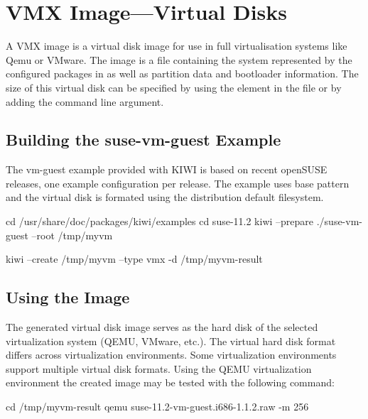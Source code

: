 \chapter{VMX Image---Virtual Disks}
\label{chapter:vmx}
\minitoc

A VMX image is a virtual disk image for use in full virtualisation
systems like Qemu or VMware. The image is a file containing the
system represented by the configured packages in %
 as well
as partition data and bootloader information. The size of
this virtual disk can be specified by using the  element
in the  file or by adding the  command
line argument.

\section{Building the suse-vm-guest Example}
The vm-guest example provided with KIWI is based on recent openSUSE releases,
one example configuration per release. The example uses base pattern and the
virtual disk is formated using the distribution default filesystem.

\begin{Command}{12cm}
cd /usr/share/doc/packages/kiwi/examples
cd suse-11.2
kiwi --prepare ./suse-vm-guest --root /tmp/myvm
\end{Command}

\begin{Command}{12cm}
kiwi --create /tmp/myvm --type vmx -d /tmp/myvm-result
\end{Command}

\section{Using the Image}

The generated virtual disk image serves as the hard disk of the selected
virtualization system (QEMU, VMware, etc.). The virtual hard disk format 
differs across virtualization environments. Some virtualization environments
support multiple virtual disk formats. Using the QEMU virtualization 
environment the created image may be tested with the following command:

\begin{Command}{12cm}
cd /tmp/myvm-result
qemu suse-11.2-vm-guest.i686-1.1.2.raw -m 256
\end{Command}

